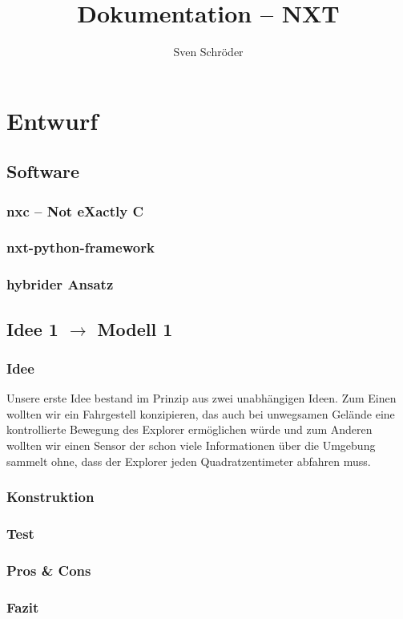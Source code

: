 \documentclass[10pt,a4paper]{scrartcl}
\author{Sven Schröder}
\title{Dokumentation -- NXT}
\begin{document}
\maketitle
\tableofcontents
\section{Entwurf}
\subsection{Software}
\subsubsection{nxc -- Not eXactly C}
\subsubsection{nxt-python-framework}
\subsubsection{hybrider Ansatz}
\subsection{Idee 1 $\rightarrow$ Modell 1}%
\subsubsection{Idee}
Unsere erste Idee bestand im Prinzip aus zwei unabhängigen Ideen. Zum Einen wollten wir ein Fahrgestell konzipieren, das auch bei unwegsamen Gelände eine kontrollierte Bewegung des Explorer ermöglichen würde und zum Anderen wollten wir einen Sensor der schon viele Informationen über die Umgebung sammelt ohne, dass der Explorer jeden Quadratzentimeter abfahren muss.
\subsubsection{Konstruktion}
\subsubsection{Test}
\subsubsection{Pros \& Cons}
\subsubsection{Fazit}
\end{document}
